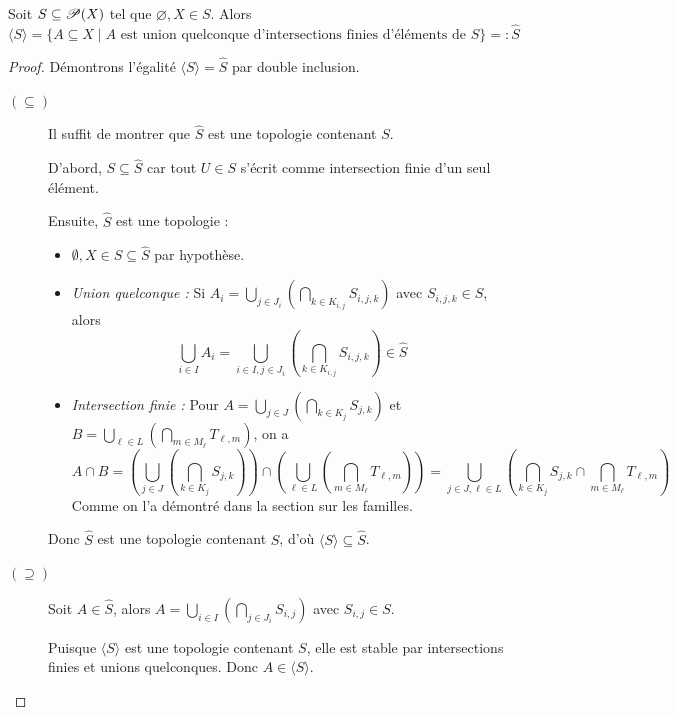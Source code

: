 \begin{proposition}
    Soit $S\subseteq\mathscr{P}(X)$ tel que $\varnothing,X\in S$. Alors \begin{equation*}
        \langle S\rangle=\{A\subseteq X\mid A \text{ est union quelconque d'intersections finies d'éléments de } S\}=:\hat S
    \end{equation*}
\end{proposition}
\begin{proof}
 Démontrons l'égalité $\langle S \rangle = \widehat{S}$ par double inclusion.

\begin{description}
\item[ $(\subseteq)$] 
Il suffit de montrer que $\widehat{S}$ est une topologie contenant $S$.

D'abord, $S \subseteq \widehat{S}$ car tout $U \in S$ s'écrit comme intersection finie d'un seul élément.

Ensuite, $\widehat{S}$ est une topologie :
\begin{itemize}
\item $\emptyset, X \in S \subseteq \widehat{S}$ par hypothèse.
\item \textit{Union quelconque :} Si $A_i = \bigcup_{j \in J_i} (\bigcap_{k \in K_{i,j}} S_{i,j,k})$ avec $S_{i,j,k} \in S$, alors 
\[
\bigcup_{i \in I} A_i = \bigcup_{i \in I, j \in J_i} \left(\bigcap_{k \in K_{i,j}} S_{i,j,k}\right) \in \widehat{S}
\]
\item \textit{Intersection finie :} Pour $A = \bigcup_{j \in J} (\bigcap_{k \in K_j} S_{j,k})$ et $B = \bigcup_{\ell \in L} (\bigcap_{m \in M_\ell} T_{\ell,m})$, on a
\[
A \cap B = \left(\bigcup_{j \in J} (\bigcap_{k \in K_j} S_{j,k})\right)\cap\left(\bigcup_{\ell \in L} (\bigcap_{m \in M_\ell} T_{\ell,m})\right)=\bigcup_{j \in J, \ell \in L} \left(\bigcap_{k \in K_j} S_{j,k} \cap \bigcap_{m \in M_\ell} T_{\ell,m}\right) \]
Comme on l'a démontré dans la section sur les familles.
\end{itemize}
\smallskip
Donc $\widehat{S}$ est une topologie contenant $S$, d'où $\langle S \rangle \subseteq \widehat{S}$.

\medskip
\item[$(\supseteq)$] 
Soit $A \in \widehat{S}$, alors $A = \bigcup_{i \in I} (\bigcap_{j \in J_i} S_{i,j})$ avec $S_{i,j} \in S$.

Puisque $\langle S \rangle$ est une topologie contenant $S$, elle est stable par intersections finies et unions quelconques. Donc $A \in \langle S \rangle$.
\end{description}
\end{proof}

